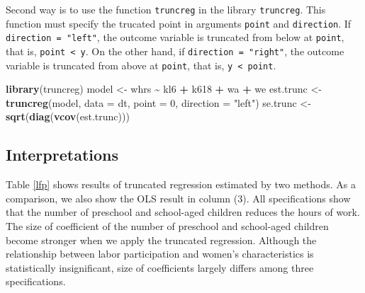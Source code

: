 \documentclass[
  12pt,
]{article}
\newenvironment{Shaded}{\begin{snugshade}}{\end{snugshade}}
\newcommand{\DataTypeTok}[1]{\textcolor[rgb]{0.13,0.29,0.53}{#1}}
\newcommand{\DecValTok}[1]{\textcolor[rgb]{0.00,0.00,0.81}{#1}}
\newcommand{\KeywordTok}[1]{\textcolor[rgb]{0.13,0.29,0.53}{\textbf{#1}}}
\newcommand{\NormalTok}[1]{#1}
\newcommand{\OperatorTok}[1]{\textcolor[rgb]{0.81,0.36,0.00}{\textbf{#1}}}
\newcommand{\StringTok}[1]{\textcolor[rgb]{0.31,0.60,0.02}{#1}}
\begin{document}
Second way is to use the function \texttt{truncreg} in the library
\texttt{truncreg}. This function must specify the trucated point in
arguments \texttt{point} and \texttt{direction}. If
\texttt{direction\ =\ "left"}, the outcome variable is truncated from
below at \texttt{point}, that is, \texttt{point\ \textless{}\ y}. On the
other hand, if \texttt{direction\ =\ "right"}, the outcome variable is
truncated from above at \texttt{point}, that is,
\texttt{y\ \textless{}\ point}.

\begin{Shaded}
\begin{Highlighting}[]
\KeywordTok{library}\NormalTok{(truncreg)}
\NormalTok{model \textless{}{-}}\StringTok{ }\NormalTok{whrs }\OperatorTok{\textasciitilde{}}\StringTok{ }\NormalTok{kl6 }\OperatorTok{+}\StringTok{ }\NormalTok{k618 }\OperatorTok{+}\StringTok{ }\NormalTok{wa }\OperatorTok{+}\StringTok{ }\NormalTok{we}
\NormalTok{est.trunc \textless{}{-}}\StringTok{ }\KeywordTok{truncreg}\NormalTok{(model, }\DataTypeTok{data =}\NormalTok{ dt, }\DataTypeTok{point =} \DecValTok{0}\NormalTok{, }\DataTypeTok{direction =} \StringTok{"left"}\NormalTok{)}
\NormalTok{se.trunc \textless{}{-}}\StringTok{ }\KeywordTok{sqrt}\NormalTok{(}\KeywordTok{diag}\NormalTok{(}\KeywordTok{vcov}\NormalTok{(est.trunc)))}
\end{Highlighting}
\end{Shaded}

\hypertarget{interpretations}{%
\subsection{Interpretations}\label{interpretations}}

Table \ref{lfp} shows results of truncated regression estimated by two
methods. As a comparison, we also show the OLS result in column (3). All
specifications show that the number of preschool and school-aged
children reduces the hours of work. The size of coefficient of the
number of preschool and school-aged children become stronger when we
apply the truncated regression. Although the relationship between labor
participation and women's characteristics is statistically
insignificant, size of coefficients largely differs among three
specifications.
\end{document}
